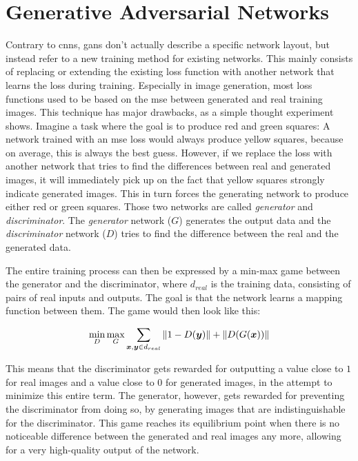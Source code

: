 \section{Generative Adversarial Networks}
Contrary to \glspl{cnn}, \glspl{gan} don't actually describe a specific network layout, but instead refer to a new training method for existing networks. This mainly consists of replacing or extending the existing loss function with another network that learns the loss during training. Especially in image generation, most loss functions used to be based on the \gls{mse} between generated and real training images. This technique has major drawbacks, as a simple thought experiment shows. Imagine a task where the goal is to produce red and green squares: A network trained with an \gls{mse} loss would always produce yellow squares, because on average, this is always the best guess. However, if we replace the loss with another network that tries to find the differences between real and generated images, it will immediately pick up on the fact that yellow squares strongly indicate generated images. This in turn forces the generating network to produce either red or green squares. Those two networks are called \emph{generator} and \emph{discriminator}. The \emph{generator} network ($G$) generates the output data and the \emph{discriminator} network ($D$) tries to find the difference between the real and the generated data.

The entire training process can then be expressed by a min-max game between the generator and the discriminator, where $d_{real}$ is the training data, consisting of pairs of real inputs and outputs. The goal is that the network learns a mapping function between them. The game would then look like this:

\begin{equation}\label{equation:minMaxGame}
\min_D\max_G \sum_{\bm x, \bm y \in d_{real}} {\mathord{\| 1 - D(\bm y) \|}} + {\mathord{\| D(G(\bm x)) \|}}
\end{equation}

This means that the discriminator gets rewarded for outputting a value close to $1$ for real images and a value close to $0$ for generated images, in the attempt to minimize this entire term. The generator, however, gets rewarded for preventing the discriminator from doing so, by generating images that are indistinguishable for the discriminator.
This game reaches its equilibrium point when there is no noticeable difference between the generated and real images any more, allowing for a very high-quality output of the network.

